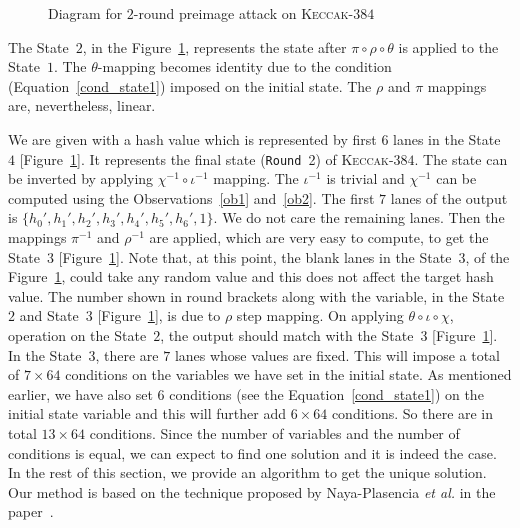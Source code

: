 \documentclass[runningheads]{llncs}
\newcommand{\Keccak}{\mbox{\textsc{Keccak}}}
\newcommand{\etal}{\textit{et al. }}
\begin{document}
\begin{figure}[!t]
\begin{center}
{
}
\caption{Diagram for $2$-round preimage attack on \Keccak-$384$ \label{atk}}
\end{center}
\end{figure}
The State~$2$, in the Figure~\ref{atk}, represents the state after $\pi \circ \rho \circ \theta$ is applied to the State~$1$. 
The $\theta$-mapping becomes identity due to the condition
(Equation~\ref{cond_state1}) imposed on the initial state. 
The $\rho$ and $\pi$ mappings are, nevertheless, linear.

We are given with a hash value which is represented by first $6$ lanes in the State~$4$ [Figure~\ref{atk}]. It represents the final state ({\tt Round}~2) of \Keccak-$384$. The state can be inverted by applying $\chi^{-1} \circ \iota^{-1}$ mapping. The $\iota^{-1}$ is trivial and $\chi^{-1}$ can be computed using the Observations~\ref{ob1} and~\ref{ob2}. The first $7$ lanes of the output is $\{h_0',h_1',h_2',h_3',h_4',h_5',h_6',1\}$. We do not care the remaining  lanes. 
Then the mappings $\pi^{-1}$ and $\rho^{-1}$ are applied, which are very easy to compute, to get the State~$3$ [Figure~\ref{atk}]. Note that, at this point, the blank lanes in the State~$3$, of the Figure~\ref{atk}, could take any random value and this does not affect the target hash value.
The number shown in round brackets along with the variable, in the State~$2$ and State~$3$ [Figure~\ref{atk}], is due to $\rho$ step mapping.
On applying $\theta \circ \iota \circ \chi$, operation on the State~$2$, the output should match with the State~$3$ [Figure~\ref{atk}]. In the State~$3$, there are $7$ lanes whose values are fixed. 
This will impose a total of $7\times 64$ conditions on the variables we have set in the initial state. As mentioned earlier, we have also set $6$ conditions (see the Equation~\ref{cond_state1}) on the initial state variable and this will further add $6 \times 64$ conditions. So there are in total $13\times 64$ conditions. Since the number of variables and the number of conditions is equal, we can expect to find one solution and it is indeed the case. In the rest of this section, we provide an algorithm to get the unique solution. Our method is based on the technique proposed by Naya-Plasencia \etal in the paper~\cite{naya2011practical}.
\end{document}
